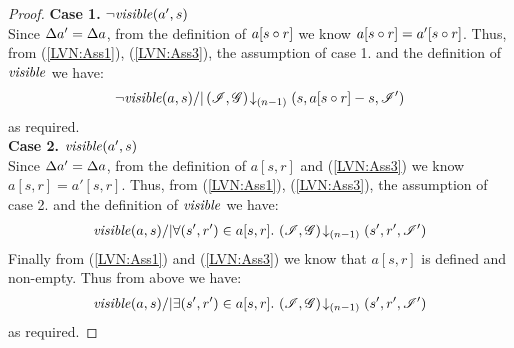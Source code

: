 \begin{lemma}[]
\begin{proof}
\noindent\textbf{Case 1. }$\neg\mathit{visible}(a', s)$\\
Since $\Delta {a'} = \Delta {a}$, from the definition of $a[s \circ r]$ we know $a[s \circ r] = a'[s \circ r]$. Thus, from (\ref{LVN:Ass1}), (\ref{LVN:Ass3}), the assumption of case 1. and the definition of $\mathit{visible}$ we have:
%
\begin{align*}
	\neg\mathit{visible}(a, s) /| \left(\mathscr{I}, \mathscr{G}\right) \!\downarrow_{(n-1)} \left(s, a[s \circ r]-s, \mathscr{I}'\right)
\end{align*}
%
as required.\\

\noindent\textbf{Case 2. }$\mathit{visible}(a', s)$\\
Since $\Delta {a'} = \Delta {a}$, from the definition of $a[s, r]$ and (\ref{LVN:Ass3}) we know $a[s, r] = a'[s, r]$. Thus, from (\ref{LVN:Ass1}), (\ref{LVN:Ass3}), the assumption of case 2. and the definition of $\mathit{visible}$ we have:
%
\begin{align*}
	\mathit{visible}(a, s) /| \forall (s', r') \in a[s, r].\, \left(\mathscr{I}, \mathscr{G}\right) \!\downarrow_{(n-1)} \left(s', r', \mathscr{I}'\right)
\end{align*}
%
Finally from (\ref{LVN:Ass1}) and (\ref{LVN:Ass3}) we know that $a[s, r]$ is defined and non-empty. Thus from above we have:
%
\begin{align*}
	\mathit{visible}(a, s) /| \exists (s', r') \in a[s, r].\, \left(\mathscr{I}, \mathscr{G}\right) \!\downarrow_{(n-1)} \left(s', r', \mathscr{I}'\right)
\end{align*}
%
as required.
\end{proof}
\end{lemma}
